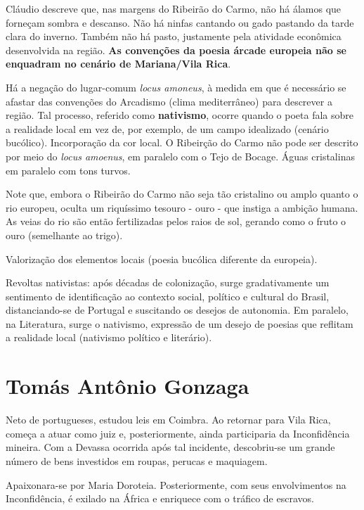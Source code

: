 \documentclass[12pt]{book}
\begin{document}
			\par Cláudio descreve que, nas margens do Ribeirão do Carmo, não há álamos que forneçam sombra e descanso. Não há ninfas cantando ou gado pastando da tarde clara do inverno. Também não há pasto, justamente pela atividade econômica desenvolvida na região. \textbf{As convenções da poesia árcade europeia não se enquadram no cenário de Mariana/Vila Rica}.
			\par Há a negação do lugar-comum \textit{locus amoneus}, à medida em que é necessário se afastar das convenções do Arcadismo (clima mediterrâneo) para descrever a região. Tal processo, referido como \textbf{nativismo}, ocorre quando o poeta fala sobre a realidade local em vez de, por exemplo, de um campo idealizado (cenário bucólico). Incorporação da cor local. O Ribeirção do Carmo não pode ser descrito por meio do \textit{locus amoenus}, em paralelo com o Tejo de Bocage. Águas cristalinas em paralelo com tons turvos.
			\par Note que, embora o Ribeirão do Carmo não seja tão cristalino ou amplo quanto o rio europeu, oculta um riquíssimo tesouro - ouro - que instiga a ambição humana. As veias do rio são então fertilizadas pelos raios de sol, gerando como o fruto o ouro (semelhante ao trigo).
			\par Valorização dos elementos locais (poesia bucólica diferente da europeia).
			\par Revoltas nativistas: após décadas de colonização, surge gradativamente um sentimento de identificação ao contexto social, político e cultural do Brasil, distanciando-se de Portugal e suscitando os desejos de autonomia. Em paralelo, na Literatura, surge o nativismo, expressão de um desejo de poesias que reflitam a realidade local (nativismo político e literário).
			\section{Tomás Antônio Gonzaga}
			\par Neto de portugueses, estudou leis em Coimbra. Ao retornar para Vila Rica, começa a atuar como juiz e, posteriormente, ainda participaria da Inconfidência mineira. Com a Devassa ocorrida após tal incidente, descobriu-se um grande número de bens investidos em roupas, perucas e maquiagem.
			\par Apaixonara-se por Maria Doroteia. Posteriormente, com seus envolvimentos na Inconfidência, é exilado na África e enriquece com o tráfico de escravos.
\end{document}
